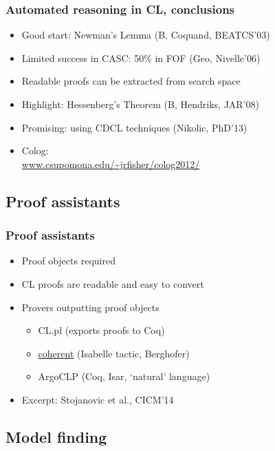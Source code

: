 \documentclass[handout,11pt]{beamer}
\begin{document}
\begin{frame}
\frametitle{Automated reasoning in CL, conclusions}
 \begin{itemize}[<+->]
   \item Good start: Newman's Lemma (B, Coquand, BEATCS'03)
   \item Limited success in CASC: 50\% in FOF (Geo, Nivelle'06)
   \item Readable proofs can be extracted from search space
   \item Highlight: Hessenberg's Theorem (B, Hendriks, JAR'08)
   \item Promising: using CDCL techniques (Nikolic, PhD'13)
    \item Colog:\\\url{www.csupomona.edu/~jrfisher/colog2012/}
 \end{itemize}
\end{frame}

\subsection{Proof assistants}

\begin{frame}
\frametitle{Proof assistants}
 \begin{itemize}[<+->]   %
    \item Proof objects \alert{required}
    \item CL proofs are readable and easy to convert
    \item Provers outputting proof objects
    \begin{itemize}
       \item CL.pl (exports proofs to Coq)
       \item \url{coherent} (Isabelle tactic, Berghofer)
       \item ArgoCLP (Coq, Isar, `natural' language)
    \end{itemize}
    \item %
                Excerpt: Stojanovic et al., CICM'14
                \href{run:/usr/bin/evince}{}
 \end{itemize}
\end{frame}

\subsection{Model finding}
\end{document}
